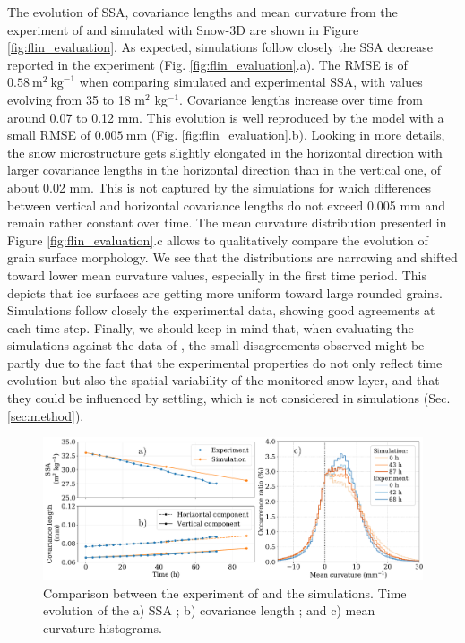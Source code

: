 \documentclass[draft,ms]{agujournal2019}
\begin{document}
The evolution of SSA, covariance lengths and mean curvature from the experiment of  and simulated with Snow-3D are shown in Figure \ref{fig:flin_evaluation}. As expected, simulations follow closely the SSA decrease reported in the experiment (Fig. \ref{fig:flin_evaluation}.a).
The RMSE is of $0.58\ \mathrm{m}^2\ \mathrm{kg}^{-1}$ when comparing simulated and experimental SSA, with values evolving from 35 to 18 m$^2$ kg$^{-1}$.
Covariance lengths increase over time from around 0.07 to 0.12 mm. This evolution is well reproduced by the model with a small RMSE of $0.005\ \mathrm{mm}$ (Fig. \ref{fig:flin_evaluation}.b). Looking in more details, the snow microstructure gets slightly elongated in the horizontal direction with larger covariance lengths in the horizontal direction than in the vertical one, of about 0.02 mm. This is not captured by the simulations for which differences between vertical and horizontal covariance lengths do not exceed 0.005 mm and remain rather constant over time. 
The mean curvature distribution presented in Figure \ref{fig:flin_evaluation}.c allows to qualitatively compare the evolution of grain surface morphology. We see that the distributions are narrowing and shifted toward lower mean curvature values, especially in the first time period. This depicts that ice surfaces are getting more uniform toward large rounded grains. Simulations follow closely the experimental data, showing good agreements at each time step. Finally, we should keep in mind that, when evaluating the simulations against the data of , the small disagreements observed might be partly due to the fact that the experimental properties do not only reflect time evolution but also the spatial variability of the monitored snow layer, and that they could be influenced by settling, which is not considered in simulations (Sec. \ref{sec:method}).\\

\begin{figure}
    \centering
    \includegraphics[width=\linewidth]{Figures/microstruct_EBONI_exp_simu.pdf}
    \caption{Comparison between the experiment of \protect{} and the simulations. Time evolution of the a) SSA ; b) covariance length ; and c) mean curvature histograms.}
    \label{fig:eboni}
\end{figure}
\end{document}
